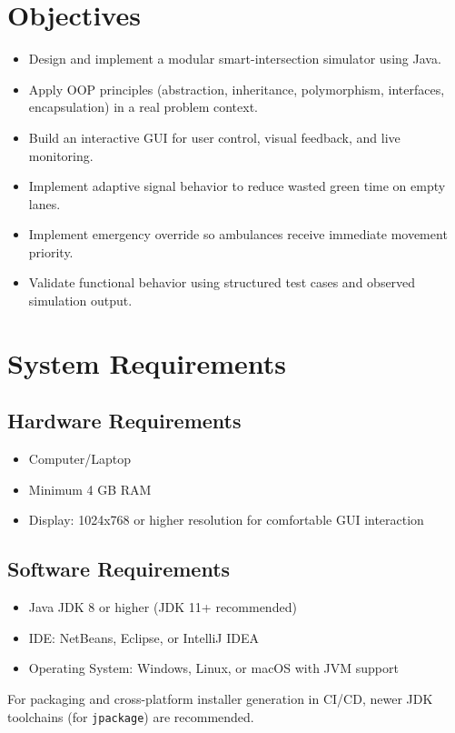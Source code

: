 \documentclass[12pt,a4paper]{article}
\begin{document}
\section{Objectives}
\begin{itemize}
    \item Design and implement a modular smart-intersection simulator using Java.
    \item Apply OOP principles (abstraction, inheritance, polymorphism, interfaces, encapsulation) in a real problem context.
    \item Build an interactive GUI for user control, visual feedback, and live monitoring.
    \item Implement adaptive signal behavior to reduce wasted green time on empty lanes.
    \item Implement emergency override so ambulances receive immediate movement priority.
    \item Validate functional behavior using structured test cases and observed simulation output.
\end{itemize}

\section{System Requirements}
\subsection{Hardware Requirements}
\begin{itemize}
    \item Computer/Laptop
    \item Minimum 4 GB RAM
    \item Display: 1024x768 or higher resolution for comfortable GUI interaction
\end{itemize}

\subsection{Software Requirements}
\begin{itemize}
    \item Java JDK 8 or higher (JDK 11+ recommended)
    \item IDE: NetBeans, Eclipse, or IntelliJ IDEA
    \item Operating System: Windows, Linux, or macOS with JVM support
\end{itemize}

For packaging and cross-platform installer generation in CI/CD, newer JDK toolchains (for \texttt{jpackage}) are recommended.
\end{document}
